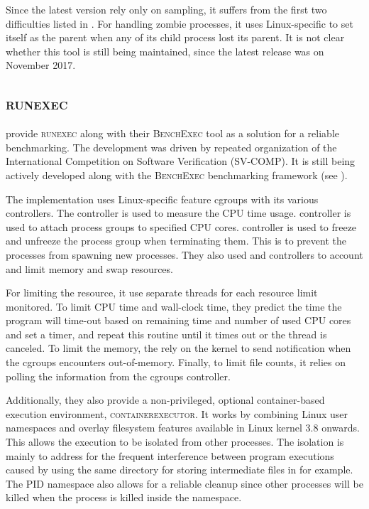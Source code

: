 Since the latest version rely only on sampling, it suffers from the first two difficulties listed in .
For handling zombie processes, it uses Linux-specific  \citep[prctl(2)]{manpages} to set itself as the parent when any of its child process lost its parent.
It is not clear whether this tool is still being maintained, since the latest release was on November 2017.


\subsection{\textsc{runexec}}

\citet{beyerReliableBenchmarkingRequirements2019} provide \textsc{runexec} along with their \textsc{BenchExec} tool as a solution for a reliable benchmarking.
The development was driven by repeated organization of the International Competition on Software Verification (SV-COMP).
It is still being actively developed along with the \textsc{BenchExec} benchmarking framework (see ).

The implementation uses Linux-specific feature cgroups with its various controllers.
The  controller is used to measure the CPU time usage.
 controller is used to attach process groups to specified CPU cores.
 controller is used to freeze and unfreeze the process group when terminating them.
This is to prevent the processes from spawning new processes.
They also used  and  controllers to account and limit memory and swap resources.

For limiting the resource, it use separate threads for each resource limit monitored.
To limit CPU time and wall-clock time, they predict the time the program will time-out based on remaining time and number of used CPU cores and set a timer, and repeat this routine until it times out or the thread is canceled.
To limit the memory, the rely on the kernel to send notification when the cgroups encounters out-of-memory.
Finally, to limit file counts, it relies on polling the information from the cgroups  controller.


Additionally, they also provide a non-privileged, optional container-based execution environment, \textsc{containerexecutor}.
It works by combining Linux user namespaces and overlay filesystem features available in Linux kernel 3.8 onwards.
This allows the execution to be isolated from other processes.
The isolation is mainly to address for the frequent interference between program executions caused by using the same directory for storing intermediate files in  for example.
The PID namespace also allows for a reliable cleanup since other processes will be killed when the  process is killed inside the namespace.


